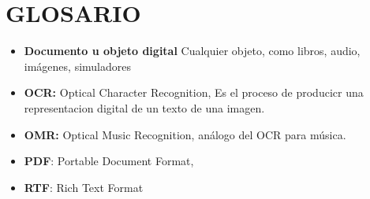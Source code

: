\chapter{GLOSARIO}
\begin{itemize}
\item \textbf{Documento u objeto digital} Cualquier objeto, como libros, audio, imágenes, simuladores
\item \textbf{OCR: }Optical Character Recognition, Es el proceso de producicr una representacion digital de un texto de una imagen.
\item \textbf{OMR: }Optical Music Recognition, análogo del OCR para música.
\item \textbf{PDF}: Portable Document Format, 
\item \textbf{RTF}: Rich Text Format
\end{itemize}




